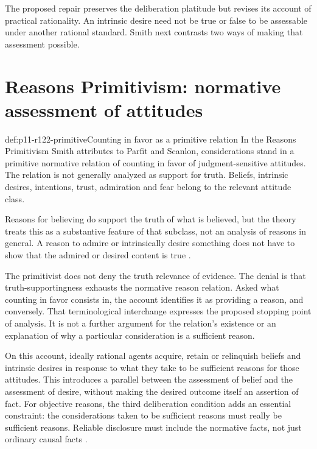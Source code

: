 The proposed repair preserves the deliberation platitude but revises its
account of practical rationality. An intrinsic desire need not be true
or false to be assessable under another rational standard. Smith next
contrasts two ways of making that assessment possible.

\section{Reasons Primitivism: normative assessment of attitudes}
\label{sec:p11-r122-primitivism}

\begin{hbdefinition}{def:p11-r122-primitive}{Counting in favor as a primitive relation}
In the Reasons Primitivism Smith attributes to Parfit and Scanlon,
considerations stand in a primitive normative relation of counting in
favor of judgment-sensitive attitudes. The relation is not generally
analyzed as support for truth. Beliefs, intrinsic desires, intentions,
trust, admiration and fear belong to the relevant attitude class.

Reasons for believing do support the truth of what is believed, but the
theory treats this as a substantive feature of that subclass, not an
analysis of reasons in general. A reason to admire or intrinsically
desire something does not have to show that the admired or desired
content is true \parencite[pp.~697--698]{Smith2021MoralReasons}.
\end{hbdefinition}

The primitivist does not deny the truth relevance of evidence. The denial
is that truth-supportingness exhausts the normative reason relation.
Asked what counting in favor consists in, the account identifies it as
providing a reason, and conversely. That terminological interchange
expresses the proposed stopping point of analysis. It is not a further
argument for the relation's existence or an explanation of why a
particular consideration is a sufficient reason.

On this account, ideally rational agents acquire, retain or relinquish
beliefs and intrinsic desires in response to what they take to be
sufficient reasons for those attitudes. This introduces a parallel
between the assessment of belief and the assessment of desire, without
making the desired outcome itself an assertion of fact. For objective
reasons, the third deliberation condition adds an essential constraint:
the considerations taken to be sufficient reasons must really be
sufficient reasons. Reliable disclosure must include the normative
facts, not just ordinary causal facts
\parencite[pp.~697--698]{Smith2021MoralReasons}.

